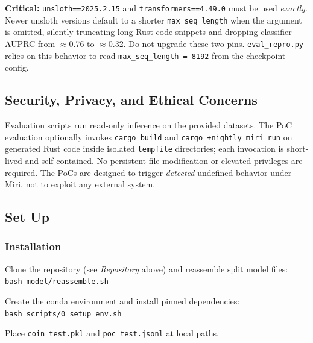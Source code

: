 \documentclass[nonacm,sigconf]{acmart}
\begin{document}
\medskip
\textbf{Critical:} \texttt{unsloth==2025.2.15} and \texttt{transformers==4.49.0}
must be used \emph{exactly}.
Newer unsloth versions default to a shorter \texttt{max\_seq\_length} when
the argument is omitted, silently truncating long Rust code snippets and
dropping classifier AUPRC from $\approx$0.76 to $\approx$0.32. Do not
upgrade these two pins.
\texttt{eval\_repro.py} relies on this behavior to read
\texttt{max\_seq\_length\,=\,8192} from the checkpoint config.


\subsection{Security, Privacy, and Ethical Concerns}

Evaluation scripts run read-only inference on the provided datasets.
The PoC evaluation optionally invokes \texttt{cargo build} and
\texttt{cargo +nightly miri run} on generated Rust code inside isolated
\texttt{tempfile} directories; each invocation is short-lived and
self-contained. No persistent file modification or elevated privileges
are required. The PoCs are designed to trigger \emph{detected}
undefined behavior under Miri, not to exploit any external system.


\subsection{Set Up}

\subsubsection{Installation}

\begin{compactenum}
\item Clone the repository (see \emph{Repository} above) and reassemble
      split model files:\\
      \texttt{bash model/reassemble.sh}
\item Create the conda environment and install pinned dependencies:\\
      \texttt{bash scripts/0\_setup\_env.sh}
\item Place \texttt{coin\_test.pkl} and \texttt{poc\_test.jsonl} at
      local paths.
\end{compactenum}
\end{document}
